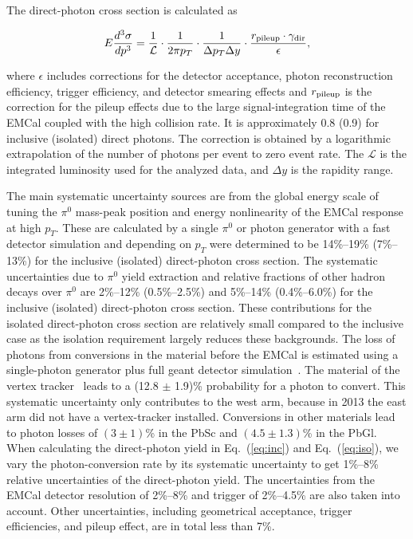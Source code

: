 \documentclass[twocolumn,letterpaper,aps,prl,longbibliography,superscriptaddress,floatfix]{revtex4-2}
\newcommand{\pT}{\mbox{$p_T$}\xspace}
\newcommand{\pizero}{\mbox{$\pi^0$}\xspace}
\begin{document}

The direct-photon cross section is calculated as

\begin{equation} \label{eq:xsecex}
E\frac{d^3\sigma}{dp^3} = \frac{1}{\mathcal{L}} \cdot \frac{1}{2\pi p_T} \cdot \frac{1}{\Delta p_T \Delta y} \cdot \frac{r_{{\rm pileup}} \cdot \gamma_{{\rm dir}}}{\epsilon},
\end{equation}

where $\epsilon$ includes corrections for the detector acceptance, 
photon reconstruction efficiency, trigger efficiency, and detector 
smearing effects and $r_{{\rm pileup}}$ is the correction for the pileup 
effects due to the large signal-integration time of the EMCal coupled 
with the high collision rate. It is approximately 0.8 (0.9) for 
inclusive (isolated) direct photons. The correction is obtained by a 
logarithmic extrapolation of the number of photons per event to zero 
event rate. The $\mathcal{L}$ is the integrated luminosity used for the 
analyzed data, and $\Delta y$ is the rapidity range.

The main systematic uncertainty sources are from the global energy scale 
of tuning the \pizero mass-peak position and energy nonlinearity of the 
EMCal response at high \pT. These are calculated by a single \pizero or 
photon generator with a fast detector simulation and depending on \pT 
were determined to be 14\%--19\% (7\%--13\%) for the inclusive (isolated) 
direct-photon cross section. The systematic uncertainties due to \pizero 
yield extraction and relative fractions of other hadron decays over 
\pizero are 2\%--12\% (0.5\%--2.5\%) and 5\%--14\% (0.4\%--6.0\%) for 
the inclusive (isolated) direct-photon cross section. These 
contributions for the isolated direct-photon cross section are 
relatively small compared to the inclusive case as the isolation 
requirement largely reduces these backgrounds. The loss of photons from 
conversions in the material before the EMCal is estimated using a 
single-photon generator plus full {\sc geant} detector 
simulation~\cite{Brun:1994aa}. The material of the vertex 
tracker~\cite{SONDHEIM2012993} leads to a (12.8 $\pm$ 1.9)\% probability 
for a photon to convert. This systematic uncertainty only contributes to 
the west arm, because in 2013 the east arm did not have a vertex-tracker 
installed.  Conversions in other materials lead to photon losses of 
$(3{\pm}1)$\% in the PbSc and $(4.5{\pm}1.3)$\% in the PbGl.  When 
calculating the direct-photon yield in Eq.~(\ref{eq:inc}) and 
Eq.~(\ref{eq:iso}), we vary the photon-conversion rate by its systematic 
uncertainty to get 1\%--8\% relative uncertainties of the direct-photon 
yield. The uncertainties from the EMCal detector resolution of 2\%--8\% 
and trigger of 2\%--4.5\% are also taken into account. Other 
uncertainties, including geometrical acceptance, trigger efficiencies, 
and pileup effect, are in total less than 7\%.
\end{document}
